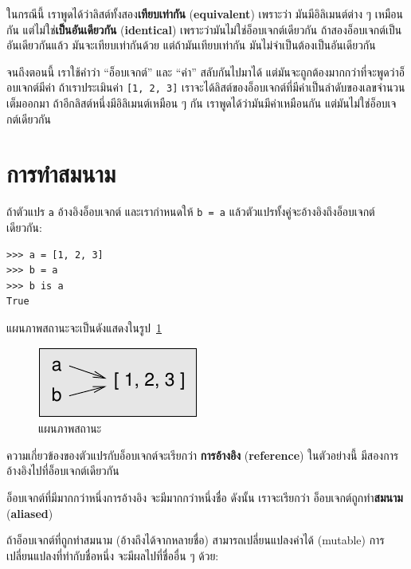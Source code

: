 ในกรณีนี้ เราพูดได้ว่าลิสต์ทั้งสอง\textbf{เทียบเท่ากัน} (\textbf{equivalent})
เพราะว่า มันมีอิลิเมนต์ต่าง ๆ เหมือนกัน
แต่ไม่ใช่\textbf{เป็นอันเดียวกัน} (\textbf{identical})
เพราะว่ามันไม่ใช่อ็อบเจกต์เดียวกัน
ถ้าสองอ็อบเจกต์เป็นอันเดียวกันแล้ว มันจะเทียบเท่ากันด้วย
แต่ถ้ามันเทียบเท่ากัน มันไม่จำเป็นต้องเป็นอันเดียวกัน

จนถึงตอนนี้ เราใช้คำว่า ``อ็อบเจกต์'' และ ``ค่า'' สลับกันไปมาได้
แต่มันจะถูกต้องมากกว่าที่จะพูดว่าอ็อบเจกต์มีค่า
%
ถ้าเราประเมินค่า \texttt{[1, 2, 3]}
เราจะได้ลิสต์ของอ็อบเจกต์ที่มีค่าเป็นลำดับของเลขจำนวนเต็มออกมา  
ถ้าอีกลิสต์หนึ่งมีอิลิเมนต์เหมือน ๆ กัน เราพูดได้ว่ามันมีค่าเหมือนกัน
แต่มันไม่ใช่อ็อบเจกต์เดียวกัน


\section{การทำสมนาม}

ถ้าตัวแปร \texttt{a} อ้างอิงอ็อบเจกต์
และเรากำหนดให้ \texttt{b = a}
แล้วตัวแปรทั้งคู่จะอ้างอิงถึงอ็อบเจกต์เดียวกัน:

\begin{verbatim}
>>> a = [1, 2, 3]
>>> b = a
>>> b is a
True
\end{verbatim}
%
แผนภาพสถานะจะเป็นดังแสดงในรูป~\ref{fig.list3}

\begin{figure}
\centerline
{\includegraphics[scale=0.8]{figs/list3.pdf}}
\caption{แผนภาพสถานะ}
\label{fig.list3}
\end{figure}

ความเกี่ยวข้องของตัวแปรกับอ็อบเจกต์จะเรียกว่า \textbf{การอ้างอิง} (\textbf{reference})
ในตัวอย่างนี้ มีสองการอ้างอิงไปที่อ็อบเจกต์เดียวกัน

อ็อบเจกต์ที่มีมากกว่าหนึ่งการอ้างอิง จะมีมากกว่าหนึ่งชื่อ
ดังนั้น เราจะเรียกว่า อ็อบเจกต์ถูกทำ\textbf{สมนาม} (\textbf{aliased})

ถ้าอ็อบเจกต์ที่ถูกทำสมนาม (อ้างถึงได้จากหลายชื่อ) สามารถเปลี่ยนแปลงค่าได้ (mutable)
การเปลี่ยนแปลงที่ทำกับชื่อหนึ่ง จะมีผลไปที่ชื่ออื่น ๆ ด้วย:

